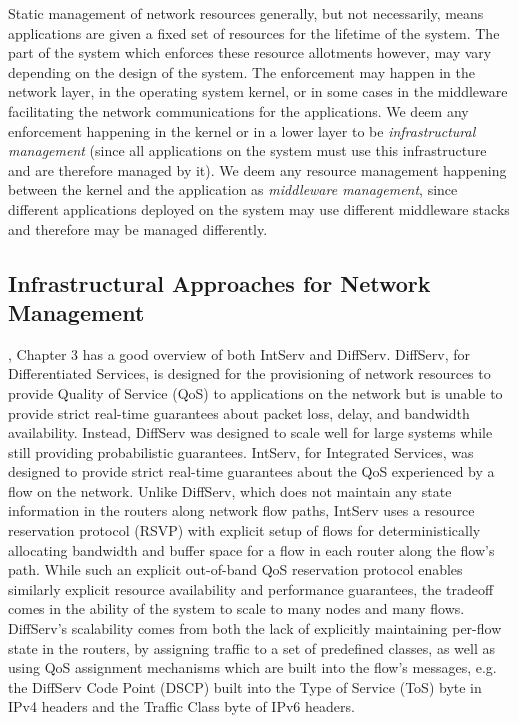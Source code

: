 Static management of network resources generally, but not necessarily, means applications are given a fixed set of resources for the lifetime of the system.  The part of the system which enforces these resource allotments however, may vary depending on the design of the system.  The enforcement may happen in the network layer, in the operating system kernel, or in some cases in the middleware facilitating the network communications for the applications.  We deem any enforcement happening in the kernel or in a lower layer to be \textit{infrastructural management} (since all applications on the system must use this infrastructure and are therefore managed by it).  We deem any resource management happening between the kernel and the application as \textit{middleware management}, since different applications deployed on the system may use different middleware stacks and therefore may be managed differently.  


\subsection{Infrastructural Approaches for Network Management}
\label{subsec:related_part2_infrastructural}

\cite{QT_Giambene2005}, Chapter 3 has a good overview of both IntServ and DiffServ.  DiffServ, for Differentiated Services, is designed for the provisioning of network resources to provide Quality of Service (QoS) to applications on the network but is unable to provide strict real-time guarantees about packet loss, delay, and bandwidth availability.  Instead, DiffServ was designed to scale well for large systems while still providing probabilistic guarantees.  IntServ, for Integrated Services, was designed to provide strict real-time guarantees about the QoS experienced by a flow on the network.  Unlike DiffServ, which does not maintain any state information in the routers along network flow paths, IntServ uses a resource reservation protocol (RSVP) with explicit setup of flows for deterministically allocating bandwidth and buffer space for a flow in each router along the flow's path.  While such an explicit out-of-band QoS reservation protocol enables similarly explicit resource availability and performance guarantees, the tradeoff comes in the ability of the system to scale to many nodes and many flows.  DiffServ's scalability comes from both the lack of explicitly maintaining per-flow state in the routers, by assigning traffic to a set of predefined classes, as well as using QoS assignment mechanisms which are built into the flow's messages, e.g. the DiffServ Code Point (DSCP) built into the Type of Service (ToS) byte in IPv4 headers and the Traffic Class byte of IPv6 headers.  

